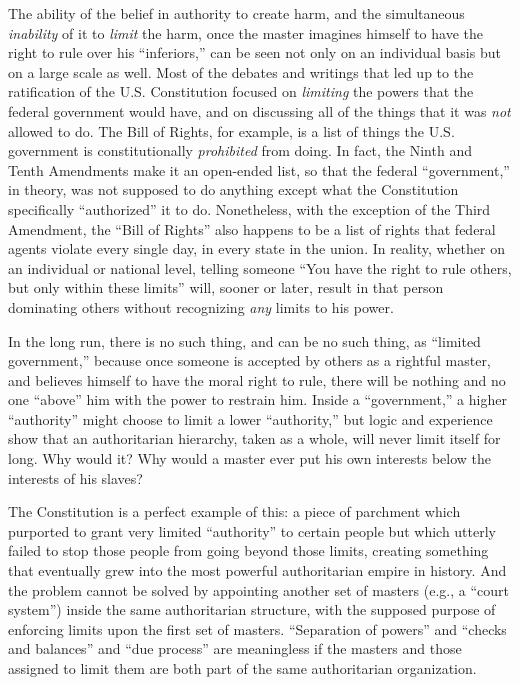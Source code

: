 \documentclass{book}
\begin{document}
The ability of the belief in authority to create harm, and the simultaneous \emph{inability} of it to \emph{limit} the harm, once the master imagines himself to have the right to rule over his \enquote{inferiors,} can be seen not only on an individual basis but on a large scale as well. Most of the debates and writings that led up to the ratification of the U.S. Constitution focused on \emph{limiting} the powers that the federal government would have, and on discussing all of the things that it was \emph{not} allowed to do. The Bill of Rights, for example, is a list of things the U.S. government is constitutionally \emph{prohibited} from doing. In fact, the Ninth and Tenth Amendments make it an open-ended list, so that the federal \enquote{government,} in theory, was not supposed to do anything except what the Constitution specifically \enquote{authorized} it to do. Nonetheless, with the exception of the Third Amendment, the \enquote{Bill of Rights} also happens to be a list of rights that federal agents violate every single day, in every state in the union. In reality, whether on an individual or national level, telling someone \enquote{You have the right to rule others, but only within these limits} will, sooner or later, result in that person dominating others without recognizing \emph{any} limits to his power.

In the long run, there is no such thing, and can be no such thing, as \enquote{limited government,} because once someone is accepted by others as a rightful master, and believes himself to have the moral right to rule, there will be nothing and no one \enquote{above} him with the power to restrain him. Inside a \enquote{government,} a higher \enquote{authority} might choose to limit a lower \enquote{authority,} but logic and experience show that an authoritarian hierarchy, taken as a whole, will never limit itself for long. Why would it? Why would a master ever put his own interests below the interests of his slaves?

The Constitution is a perfect example of this: a piece of parchment which purported to grant very limited \enquote{authority} to certain people but which utterly failed to stop those people from going beyond those limits, creating something that eventually grew into the most powerful authoritarian empire in history. And the problem cannot be solved by appointing another set of masters (e.g., a \enquote{court system}) inside the same authoritarian structure, with the supposed purpose of enforcing limits upon the first set of masters. \enquote{Separation of powers} and \enquote{checks and balances} and \enquote{due process} are meaningless if the masters and those assigned to limit them are both part of the same authoritarian organization.
\end{document}
